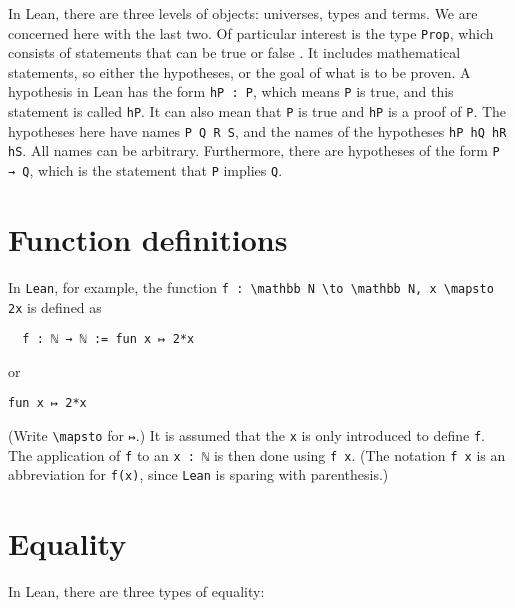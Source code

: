 \documentclass{memoir}
\begin{document}
In Lean, there are three levels of objects: universes, types and terms. We are concerned here with the last two. Of particular interest is the type \Verb|Prop|, which consists of statements that can be true or false . It includes mathematical statements, so either the hypotheses, or the goal of what is to be proven. A hypothesis in Lean has the form \Verb|hP : P|, which means \Verb|P| is true, and this statement is called \Verb|hP|. It can also mean that \Verb|P| is true and \Verb|hP| is a proof of \Verb|P|. The hypotheses here have names \Verb|P Q R S|, and the names of the hypotheses \Verb|hP hQ hR hS|. All names can be arbitrary. Furthermore, there are hypotheses of the form \Verb|P → Q|, which is the statement that \Verb|P| implies \Verb|Q|.



\section{Function definitions}

In \Verb|Lean|, for example, the function \Verb|f : \mathbb N \to \mathbb N, x \mapsto 2x| is defined as

\begin{verbatim}
  f : ℕ → ℕ := fun x ↦ 2*x

\end{verbatim}


or

\begin{verbatim}
fun x ↦ 2*x

\end{verbatim}


(Write \Verb|\mapsto| for \Verb|↦|.) It is assumed that the \Verb|x| is only introduced to
define \Verb|f|. The application of \Verb|f| to an \Verb|x : ℕ| is then done using \Verb|f x|. (The notation \Verb|f x| is an abbreviation for \Verb|f(x)|, since \Verb|Lean| is sparing with parenthesis.)



\section{Equality}

In Lean, there are three types of equality:
\end{document}

